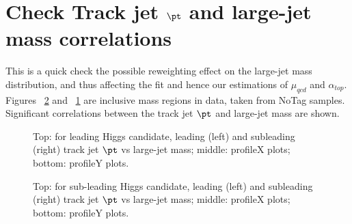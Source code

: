\section{Check Track jet $\pt$ and large-\R jet mass correlations}
\label{app:check-trkptjm}

This is a quick check the possible reweighting effect on the large-\R jet mass distribution, and thus affecting the fit and hence our estimations of $\mu_{qcd}$ and $\alpha_{top}$. Figures ~\ref{fig:app-check-subl-trkptjm} and ~\ref{fig:app-check-lead-trkptjm} are inclusive mass regions in data, taken from NoTag samples. Significant correlations between the track jet $\pt$ and large-\R jet mass are shown.

\begin{figure*}[htbp!]
\begin{center}
  \caption{Top: for leading Higgs candidate, leading (left) and subleading (right) track jet $\pt$ vs large-\R jet mass; middle: profileX plots; bottom: profileY plots. }
\label{fig:app-check-lead-trkptjm}
\end{center}
\end{figure*}


\begin{figure*}[htbp!]
\begin{center}
  \caption{Top: for sub-leading Higgs candidate, leading (left) and subleading (right) track jet $\pt$ vs large-\R jet mass; middle: profileX plots; bottom: profileY plots. }
\label{fig:app-check-subl-trkptjm}
\end{center}
\end{figure*}
